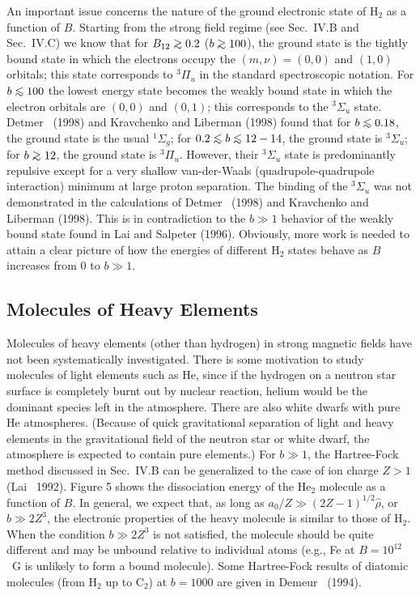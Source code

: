 An important issue concerns the nature of the ground electronic state 
of H$_2$ as a function of $B$. Starting from the strong field regime
(see Sec.~IV.B and Sec.~IV.C) we know that for $B_{12}\go 0.2$ ($b\go 100$),
the ground state is the tightly bound state in which the electrons occupy
the $(m,\nu)=(0,0)$ and $(1,0)$ orbitals; this state corresponds to
$^3\Pi_u$ in the standard spectroscopic notation. For $b\lo 100$
the lowest energy state becomes the weakly bound state in which the electron
orbitals are $(0,0)$ and $(0,1)$; this corresponds to the $^3\Sigma_u$ state.
Detmer \etal~(1998) and Kravchenko and Liberman (1998)
found that for $b\lo 0.18$, the ground state is the usual $^1\Sigma_g$;
for $0.2\lo b\lo 12-14$, the ground state is $^3\Sigma_u$;
for $b\go 12$, the ground state is $^3\Pi_u$. 
However, their $^3\Sigma_u$ state is predominantly repulsive except for a very
shallow van-der-Waals (quadrupole-quadrupole interaction) minimum at large
proton separation. The binding of the $^3\Sigma_u$ was not demonstrated in
the calculations of Detmer \etal~(1998) and Kravchenko and Liberman (1998).
This is in contradiction to the $b\gg 1$ behavior of the
weakly bound state found in Lai and Salpeter (1996). Obviously, more work is
needed to attain a clear picture of how the energies of different H$_2$ states
behave as $B$ increases from $0$ to $b\gg 1$. 

\subsection{Molecules of Heavy Elements}

Molecules of heavy elements (other than hydrogen) in strong magnetic fields
have not been systematically investigated. 
There is some motivation to study 
molecules of light elements such as He, since if the hydrogen
on a neutron star surface is completely burnt out by nuclear reaction, 
helium would be the dominant species left in the atmosphere. There are also 
white dwarfs with pure He atmospheres. (Because of quick gravitational
separation of light and heavy elements in the gravitational field
of the neutron star or white dwarf, the atmosphere is expected to contain pure
elements.) For $b\gg 1$, the Hartree-Fock method discussed
in Sec.~IV.B can be generalized to the case of ion charge $Z>1$
(Lai \etal~1992).
Figure 5 shows the dissociation energy of the He$_2$ molecule as a function of
$B$. In general, we expect that, as long as $a_0/Z\gg (2Z-1)^{1/2}\hat\rho$,
or $b\gg 2Z^3$, the electronic properties of the heavy molecule is 
similar to those of H$_2$. When the condition $b\gg 2Z^3$ is not satisfied, 
the molecule should be quite different and may be unbound relative to 
individual atoms (e.g., Fe at $B=10^{12}$~G is unlikely to form a bound
molecule). Some Hartree-Fock results of diatomic molecules (from H$_2$
up to C$_2$) at $b=1000$ are given in Demeur \etal~(1994).


